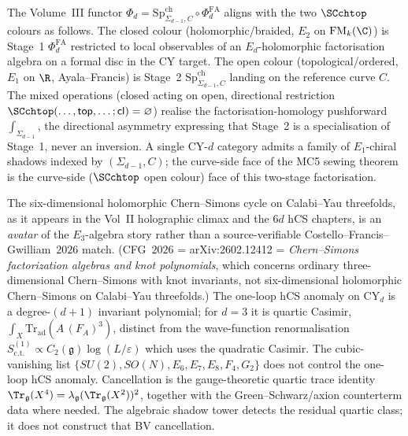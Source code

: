 \begin{remark}
\label{rem:v2-preface-phid-two-stage-sc-colours}
The Volume~III functor $\Phi_d=\mathrm{Sp}^{\mathrm{ch}}_{\Sigma_{d-1},C}\circ\Phi^{\mathrm{FA}}_d$
aligns with the two $\SCchtop$ colours as follows. The closed
colour (holomorphic/braided, $E_2$ on $\mathrm{FM}_k(\C)$) is
Stage~1 $\Phi^{\mathrm{FA}}_d$ restricted to local observables of
an $E_d$-holomorphic factorisation algebra on a formal disc in the
CY target. The open colour (topological/ordered, $E_1$ on $\R$,
Ayala--Francis) is Stage~2
$\mathrm{Sp}^{\mathrm{ch}}_{\Sigma_{d-1},C}$ landing on the
reference curve $C$. The mixed operations (closed acting on open,
directional restriction
$\SCchtop(\dots,\mathsf{top},\dots;\mathsf{cl})=\varnothing$)
realise the factorisation-homology pushforward
$\int_{\Sigma_{d-1}}$, the directional asymmetry expressing that
Stage~2 is a specialisation of Stage~1, never an inversion. A
single CY-$d$ category admits a family of $E_1$-chiral shadows
indexed by $(\Sigma_{d-1},C)$; the curve-side face of the MC5
sewing theorem is the curve-side ($\SCchtop$ open colour) face of
this two-stage factorisation.
\end{remark}

\begin{remark}
\label{rem:v2-preface-6d-hcs-avatar}
The six-dimensional holomorphic Chern--Simons cycle on Calabi--Yau
threefolds, as it appears in the Vol~II holographic climax and the
$6d$ hCS chapters, is an \emph{avatar} of the $E_3$-algebra story
rather than a source-verifiable Costello--Francis--Gwilliam~$2026$
match. (CFG~$2026$ = arXiv:2602.12412 = \emph{Chern--Simons
factorization algebras and knot polynomials}, which concerns
ordinary three-dimensional Chern--Simons with knot invariants, not
six-dimensional holomorphic Chern--Simons on Calabi--Yau
threefolds.) The one-loop hCS anomaly on CY$_d$ is a
degree-$(d+1)$ invariant polynomial; for $d=3$ it is quartic
Casimir, $\int_X\mathrm{Tr}_{\mathrm{ad}}(A\,(F_A)^3)$, distinct
from the wave-function renormalisation
$S^{(1)}_{\mathrm{c.t.}}\propto C_2(\mathfrak g)\log(L/\varepsilon)$
which uses the quadratic Casimir. The cubic-vanishing list
$\{SU(2),SO(N),E_6,E_7,E_8,F_4,G_2\}$ does not control the
one-loop hCS anomaly. Cancellation is the gauge-theoretic quartic trace
identity $\Tr_{\mathfrak g}(X^4)=
\lambda_{\mathfrak g}(\Tr_{\mathfrak g}(X^2))^2$, together with the
Green--Schwarz/axion counterterm data where needed. The algebraic
shadow tower detects the residual quartic class; it does not construct
that BV cancellation.
\end{remark}
